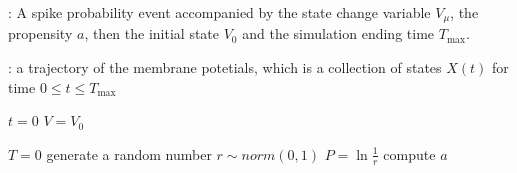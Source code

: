 \begin{algorithm}
\DontPrintSemicolon
{}

\caption{\protect\TitleFunction{}}
\label{algo:mnrm}

\Input: A spike probability event accompanied by the state change variable $V_\mu$, the propensity $a$, then the initial state $V_0$ and the simulation ending time $T_{\max}$.\;

\Output: a trajectory of the membrane potetials, which is a collection of states $X(t)$ for time $0\le t\le T_{\max}$\;

$t = 0$\;
$V = V_0$\;

$T = 0$\;
generate a random number $r\sim norm(0,1)$\;
$P = \ln\frac{1}{r}$\;
compute $a$\;



\end{algorithm}
